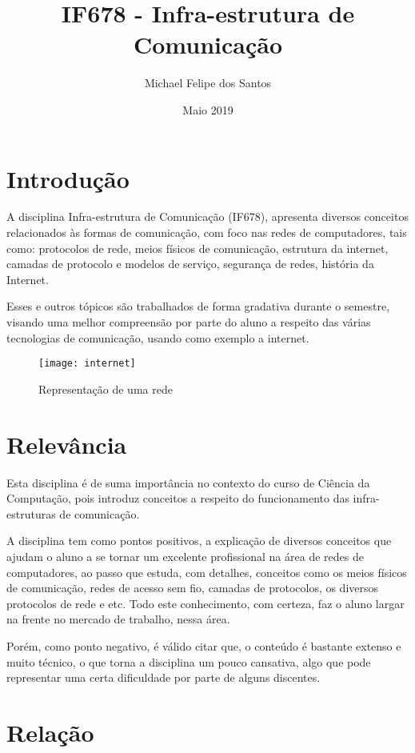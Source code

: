\documentclass[10pt]{article}
\title{IF678 - Infra-estrutura de Comunicação}
\author{Michael Felipe dos Santos }
\date{Maio 2019}
\begin{document}
\maketitle

\section{Introdução}
A disciplina Infra-estrutura de Comunicação (IF678), apresenta diversos conceitos relacionados às formas de comunicação, com foco nas redes de computadores, tais como: protocolos de rede,  meios físicos de comunicação, estrutura da internet, camadas de protocolo e modelos de serviço, segurança de redes, história da Internet.
\cite{sitedadisciplina}

Esses e outros tópicos são trabalhados de forma gradativa durante o semestre, visando uma melhor compreensão por parte do aluno a respeito das várias tecnologias de comunicação, usando como exemplo a internet.

\begin{figure}[h!]
    \centering
    \texttt{[image: internet]}
    \caption{Representação de uma rede \cite{figura1}}
    \label{fig:internet}
\end{figure}

\section{Relevância}
Esta disciplina é de suma importância no contexto do curso de Ciência da Computação, pois introduz conceitos a respeito do funcionamento das infra-estruturas de comunicação.

A disciplina tem como pontos positivos, a explicação de diversos conceitos que ajudam o aluno a se tornar um excelente profissional na área de redes de computadores, ao passo que estuda, com detalhes, conceitos como os meios físicos de comunicação, redes de acesso sem fio, camadas de protocolos, os diversos protocolos de rede e etc. \cite{slide} Todo este conhecimento, com certeza, faz o aluno largar na frente no mercado de trabalho, nessa área.

Porém, como ponto negativo, é válido citar que, o conteúdo é bastante extenso e muito técnico\cite{gradecurricular}, o que torna a disciplina um pouco cansativa, algo que pode representar uma certa dificuldade por parte de alguns discentes.

\section{Relação}
\end{document}

